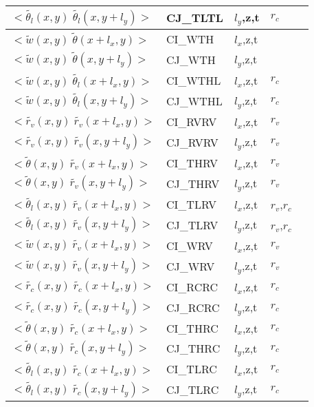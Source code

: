 \begin{longtable}[c]{|p{}|p{}|p{}|p{}|p{}|}
$<\tilde{\theta_l}(x,y)\;\tilde{\theta_l}(x,y+l_y)>$ & CJ\_TLTL  & $l_y$,z,t & $r_c$       & \\\hline
$<\tilde{w}(x,y)\;\tilde{\theta}(x+l_x,y)>$          & CI\_WTH   & $l_x$,z,t &             & \\\hline
$<\tilde{w}(x,y)\;\tilde{\theta}(x,y+l_y)>$          & CJ\_WTH   & $l_y$,z,t &             & \\\hline
$<\tilde{w}(x,y)\;\tilde{\theta_l}(x+l_x,y)>$        & CI\_WTHL  & $l_x$,z,t & $r_c$       & \\\hline
$<\tilde{w}(x,y)\;\tilde{\theta_l}(x,y+l_y)>$        & CJ\_WTHL  & $l_y$,z,t & $r_c$       & \\\hline
$<\tilde{r_v}(x,y)\;\tilde{r_v}(x+l_x,y)>$           & CI\_RVRV  & $l_x$,z,t & $r_v$       & \\\hline
$<\tilde{r_v}(x,y)\;\tilde{r_v}(x,y+l_y)>$           & CJ\_RVRV  & $l_y$,z,t & $r_v$       & \\\hline
$<\tilde{\theta}(x,y)\;\tilde{r_v}(x+l_x,y)>$        & CI\_THRV  & $l_x$,z,t & $r_v$       & \\\hline
$<\tilde{\theta}(x,y)\;\tilde{r_v}(x,y+l_y)>$        & CJ\_THRV  & $l_y$,z,t & $r_v$       & \\\hline
$<\tilde{\theta_l}(x,y)\;\tilde{r_v}(x+l_x,y)>$      & CI\_TLRV  & $l_x$,z,t & $r_v$,$r_c$ & \\\hline
$<\tilde{\theta_l}(x,y)\;\tilde{r_v}(x,y+l_y)>$      & CJ\_TLRV  & $l_y$,z,t & $r_v$,$r_c$ & \\\hline
$<\tilde{w}(x,y)\;\tilde{r_v}(x+l_x,y)>$             & CI\_WRV   & $l_x$,z,t & $r_v$       & \\\hline
$<\tilde{w}(x,y)\;\tilde{r_v}(x,y+l_y)>$             & CJ\_WRV   & $l_y$,z,t & $r_v$       & \\\hline
$<\tilde{r_c}(x,y)\;\tilde{r_c}(x+l_x,y)>$           & CI\_RCRC  & $l_x$,z,t & $r_c$       & \\\hline
$<\tilde{r_c}(x,y)\;\tilde{r_c}(x,y+l_y)>$           & CJ\_RCRC  & $l_y$,z,t & $r_c$       & \\\hline
$<\tilde{\theta}(x,y)\;\tilde{r_c}(x+l_x,y)>$        & CI\_THRC  & $l_x$,z,t & $r_c$       & \\\hline
$<\tilde{\theta}(x,y)\;\tilde{r_c}(x,y+l_y)>$        & CJ\_THRC  & $l_y$,z,t & $r_c$       & \\\hline
$<\tilde{\theta_l}(x,y)\;\tilde{r_c}(x+l_x,y)>$      & CI\_TLRC  & $l_x$,z,t & $r_c$       & \\\hline
$<\tilde{\theta_l}(x,y)\;\tilde{r_c}(x,y+l_y)>$      & CJ\_TLRC  & $l_y$,z,t & $r_c$       & \\\hline

\end{longtable}
